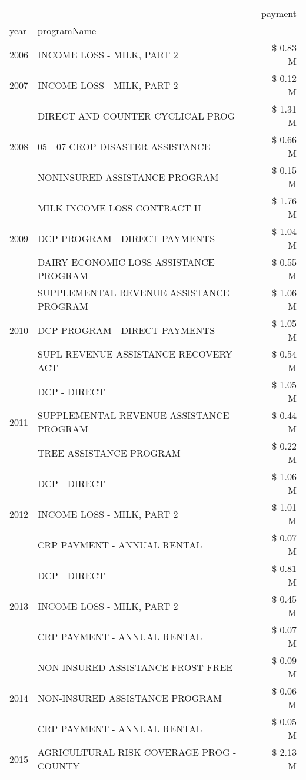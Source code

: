 \begin{tabular}{llr}
\toprule
 &  & payment \\
year & programName &  \\
\midrule
2006 & INCOME LOSS - MILK, PART 2 & \$ 0.83 M \\
\cline{1-3}
2007 & INCOME LOSS - MILK, PART 2 & \$ 0.12 M \\
\cline{1-3}
\multirow[t]{3}{*}{2008} & DIRECT AND COUNTER CYCLICAL PROG & \$ 1.31 M \\
 & 05 - 07 CROP DISASTER ASSISTANCE & \$ 0.66 M \\
 & NONINSURED ASSISTANCE PROGRAM & \$ 0.15 M \\
\cline{1-3}
\multirow[t]{3}{*}{2009} & MILK INCOME LOSS CONTRACT II & \$ 1.76 M \\
 & DCP PROGRAM - DIRECT PAYMENTS & \$ 1.04 M \\
 & DAIRY ECONOMIC LOSS ASSISTANCE PROGRAM & \$ 0.55 M \\
\cline{1-3}
\multirow[t]{3}{*}{2010} & SUPPLEMENTAL REVENUE ASSISTANCE PROGRAM & \$ 1.06 M \\
 & DCP PROGRAM - DIRECT PAYMENTS & \$ 1.05 M \\
 & SUPL REVENUE ASSISTANCE RECOVERY ACT & \$ 0.54 M \\
\cline{1-3}
\multirow[t]{3}{*}{2011} & DCP - DIRECT & \$ 1.05 M \\
 & SUPPLEMENTAL REVENUE ASSISTANCE PROGRAM & \$ 0.44 M \\
 & TREE ASSISTANCE PROGRAM & \$ 0.22 M \\
\cline{1-3}
\multirow[t]{3}{*}{2012} & DCP - DIRECT & \$ 1.06 M \\
 & INCOME LOSS - MILK, PART 2 & \$ 1.01 M \\
 & CRP PAYMENT - ANNUAL RENTAL & \$ 0.07 M \\
\cline{1-3}
\multirow[t]{3}{*}{2013} & DCP - DIRECT & \$ 0.81 M \\
 & INCOME LOSS - MILK, PART 2 & \$ 0.45 M \\
 & CRP PAYMENT - ANNUAL RENTAL & \$ 0.07 M \\
\cline{1-3}
\multirow[t]{3}{*}{2014} & NON-INSURED ASSISTANCE FROST FREE & \$ 0.09 M \\
 & NON-INSURED ASSISTANCE PROGRAM & \$ 0.06 M \\
 & CRP PAYMENT - ANNUAL RENTAL & \$ 0.05 M \\
\cline{1-3}
\multirow[t]{3}{*}{2015} & AGRICULTURAL RISK COVERAGE PROG - COUNTY & \$ 2.13 M \\

\end{tabular}
